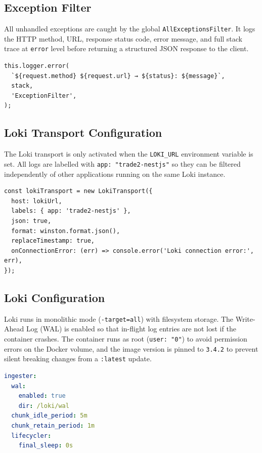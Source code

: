 \documentclass[12pt, a4paper]{article}
\begin{document}
\subsection{Exception Filter}

All unhandled exceptions are caught by the global \texttt{AllExceptionsFilter}. It logs the HTTP method, URL, response status code, error message, and full stack trace at \texttt{error} level before returning a structured JSON response to the client.

\begin{lstlisting}[style=code, language={[Sharp]C}, caption=AllExceptionsFilter logging an exception]
this.logger.error(
  `${request.method} ${request.url} → ${status}: ${message}`,
  stack,
  'ExceptionFilter',
);
\end{lstlisting}

\subsection{Loki Transport Configuration}

The Loki transport is only activated when the \texttt{LOKI\_URL} environment variable is set. All logs are labelled with \texttt{app: "trade2-nestjs"} so they can be filtered independently of other applications running on the same Loki instance.

\begin{lstlisting}[style=code, language={[Sharp]C}, caption=Loki transport setup in AppLogger]
const lokiTransport = new LokiTransport({
  host: lokiUrl,
  labels: { app: 'trade2-nestjs' },
  json: true,
  format: winston.format.json(),
  replaceTimestamp: true,
  onConnectionError: (err) => console.error('Loki connection error:', err),
});
\end{lstlisting}

\subsection{Loki Configuration}

Loki runs in monolithic mode (\texttt{-target=all}) with filesystem storage. The Write-Ahead Log (WAL) is enabled so that in-flight log entries are not lost if the container crashes. The container runs as root (\texttt{user: "0"}) to avoid permission errors on the Docker volume, and the image version is pinned to \texttt{3.4.2} to prevent silent breaking changes from a \texttt{:latest} update.

\begin{lstlisting}[style=code, language=yaml, caption=Loki ingester configuration]
ingester:
  wal:
    enabled: true
    dir: /loki/wal
  chunk_idle_period: 5m
  chunk_retain_period: 1m
  lifecycler:
    final_sleep: 0s
\end{lstlisting}
\end{document}
